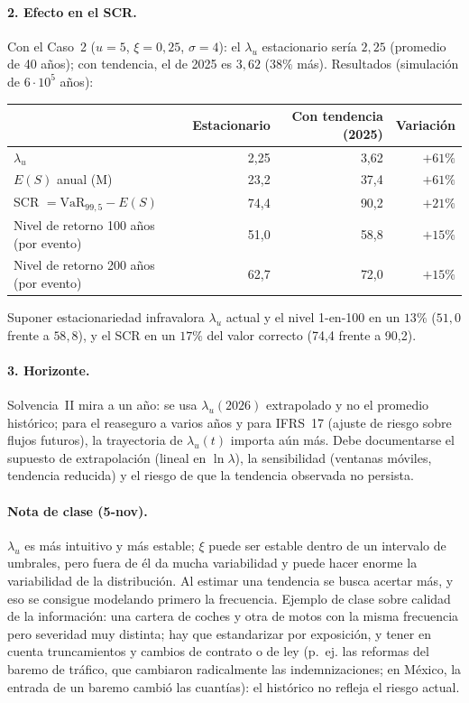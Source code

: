 \documentclass[a4paper,12pt]{article}
\newcommand{\euro}{\texteuro}
\newcommand{\VaR}{\mathrm{VaR}}
\begin{document}
\paragraph{2. Efecto en el SCR.} Con el Caso~2 ($u=5$, $\xi=0{,}25$, $\sigma=4$): el $\lambda_u$ estacionario ser\'ia $2{,}25$ (promedio de 40 a\~nos); con tendencia, el de 2025 es $3{,}62$ ($38\%$ m\'as). Resultados (simulaci\'on de $6\cdot10^5$ a\~nos):
\begin{center}
\small
\begin{tabular}{lrrr}
\toprule
 & Estacionario & Con tendencia (2025) & Variaci\'on\\
\midrule
$\lambda_u$ & 2,25 & 3,62 & $+61\%$\\
$E(S)$ anual (M\euro) & 23,2 & 37,4 & $+61\%$\\
SCR $=\VaR_{99,5}-E(S)$ & 74,4 & 90,2 & $+21\%$\\
Nivel de retorno 100 a\~nos (por evento) & 51,0 & 58,8 & $+15\%$\\
Nivel de retorno 200 a\~nos (por evento) & 62,7 & 72,0 & $+15\%$\\
\bottomrule
\end{tabular}
\end{center}
Suponer estacionariedad infravalora $\lambda_u$ actual y el nivel 1-en-100 en un $13\%$ ($51{,}0$ frente a $58{,}8$), y el SCR en un $17\%$ del valor correcto (74,4 frente a 90,2).

\paragraph{3. Horizonte.} Solvencia~II mira a un a\~no: se usa $\lambda_u(2026)$ extrapolado y no el promedio hist\'orico; para el reaseguro a varios a\~nos y para IFRS~17 (ajuste de riesgo sobre flujos futuros), la trayectoria de $\lambda_u(t)$ importa a\'un m\'as. Debe documentarse el supuesto de extrapolaci\'on (lineal en $\ln\lambda$), la sensibilidad (ventanas m\'oviles, tendencia reducida) y el riesgo de que la tendencia observada no persista.

\paragraph{Nota de clase (5-nov).} $\lambda_u$ es m\'as intuitivo y m\'as estable; $\xi$ puede ser estable dentro de un intervalo de umbrales, pero fuera de \'el da mucha variabilidad y puede hacer enorme la variabilidad de la distribuci\'on. Al estimar una tendencia se busca acertar m\'as, y eso se consigue modelando primero la frecuencia. Ejemplo de clase sobre calidad de la informaci\'on: una cartera de coches y otra de motos con la misma frecuencia pero severidad muy distinta; hay que estandarizar por exposici\'on, y tener en cuenta truncamientos y cambios de contrato o de ley (p.~ej. las reformas del baremo de tr\'afico, que cambiaron radicalmente las indemnizaciones; en M\'exico, la entrada de un baremo cambi\'o las cuant\'ias): el hist\'orico no refleja el riesgo actual.
\end{document}
